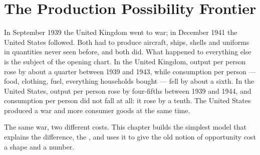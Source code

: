 \chapter{The Production Possibility Frontier}\label{ch:g10:production-possibility-frontier}

In September 1939 the United Kingdom went to war; in December 1941 the United States followed.
Both had to produce aircraft, ships, shells and uniforms in quantities never seen before, and both
did. What happened to everything else is the subject of the opening chart. In the United Kingdom,
output per person rose by about a quarter between 1939 and 1943, while consumption per person ---
food, clothing, fuel, everything households bought --- fell by about a sixth. In the United States,
output per person rose by four-fifths between 1939 and 1944, and consumption per person did not
fall at all: it rose by a tenth. The United States produced a war and more consumer goods at the same
time.

The same war, two different costs. This chapter builds the simplest model that explains the
difference, the , and uses it to give the old notion of opportunity
cost a shape and a number.

